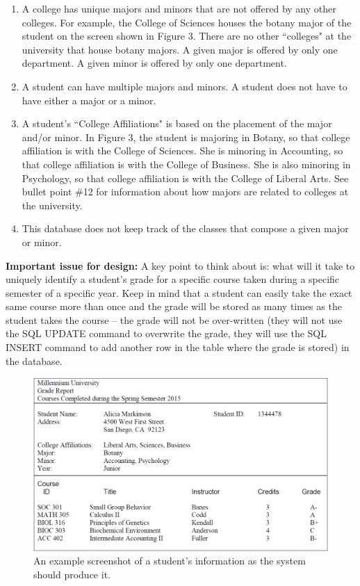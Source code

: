 \documentclass{article}
\begin{document}
\begin{enumerate}
  \item A college has unique majors and minors that are not offered by any other colleges. For example, the College of Sciences houses the botany major of the student on the screen shown in Figure 3. There are no other ``colleges" at the university that house botany majors. A given major is offered by only one department. A given minor is offered by only one department.
  
  \item A student can have multiple majors and minors. A student does not have to have either a major or a minor.
  
  \item A student’s ``College Affiliations" is based on the placement of the major and/or minor. In Figure 3, the student is majoring in Botany, so that college affiliation is with the College of Sciences. She is minoring in Accounting, so that college affiliation is with the College of Business. She is also minoring in Psychology, so that college affiliation is with the College of Liberal Arts. See bullet point \#12 for information about how majors are related to colleges at the university.
  
  \item This database does not keep track of the classes that compose a given major or minor.
\end{enumerate}
\textbf{Important issue for design:} A key point to think about is: what will it take to uniquely identify a student’s grade for a specific course taken during a specific semester of a specific year. Keep in mind that a student can easily take the exact same course more than once and the grade will be stored as many times as the student takes the course – the grade will not be over-written (they will not use the SQL UPDATE command to overwrite the grade, they will use the SQL INSERT command to add another row in the table where the grade is stored) in the database.

\begin{figure}[h!]
  \centering
  \includegraphics[width=.65\linewidth]{HW08_Ex02_student_info_screen}
  \caption{An example screenshot of a student's information as the system should produce it.}
  \label{fig:HW08_Ex01_order_form}
\end{figure}
\end{document}
